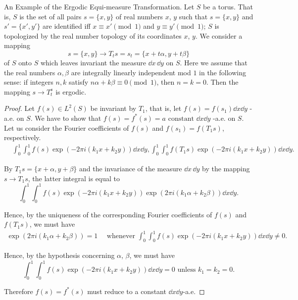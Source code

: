 \begin{enumerate}[1.]
An Example of the Ergodic Equi-measure Transformation. Let $S$ be a torus. That is, $S$ is the set of all pairs $s = \{x, y\}$ of real numbers $x$, $y$ such that $s = \{x, y\}$ and $s' = \{x', y'\}$ are identified iff $x \equiv x' \pmod{1}$ and $y \equiv y' \pmod{1}$; $S$ is topologized by the real number topology of its coordinates $x$, $y$. We consider a mapping 
\[
s = \{x, y \} \rightarrow T _{t} s = s _{t} = \{x + t \alpha , y + t \beta \}
\]
of $S$ onto $S$ which leaves invariant the measure $\dd x \, \dd y$ on $S$. Here we assume that the real numbers $\alpha, \beta$ are integrally linearly independent mod $1$ in the following sense: if integers $n, k$ satisfy $n\alpha + k\beta \equiv 0 \pmod{1}$, then $n = k = 0$. Then the mapping $s \to T_t^s$ is ergodic. 

\begin{proof}
 Let $f(s) \in L^2(S)$ be invariant by $T_1$, that is, let $f(s) = f(s_1) \dd x \dd y$ -a.e. on $S$. We have to show that $f(s) = f^*(s) = a \text{ constant } \dd x \dd y$ -a.e. on $S$. Let us consider the Fourier coefficients of $f(s)$ and $f(s_1) = f(T_1 s)$, respectively. 
\[
\begin{aligned}
&\int_{0} ^{1} \int_{0} ^{1} f (s) \exp (- 2 \pi i (k _{1} x + k _{2} y)) \dd x \dd y, \int_{0} ^{1} \int_{0} ^{1} f (T _{1} s) \exp (- 2 \pi i (k _{1} x + k _{2} y)) \dd x \dd y.
\end{aligned}
\]

By $T_{1}s = \{x + \alpha, y + \beta\}$ and the invariance of the measure $\dd x \, \dd y$ by the mapping $s \to T_{1}s$, the latter integral is equal to 
\[
\int_{0} ^{1} \int_{0} ^{1} f (s) \exp \left(- 2 \pi i (k _{1} x + k _{2} y)\right) \exp \left(2 \pi i (k _{1} \alpha + k _{2} \beta)\right) \dd x \dd y.
\]

Hence, by the uniqueness of the corresponding Fourier coefficients of $f(s)$ and $f(T_{1}s)$, we must have 
\[
\begin{gathered}
\exp (2 \pi i (k _{1} \alpha + k _{2} \beta)) = 1 \quad \text{ whenever } \int_{0} ^{1} \int_{0} ^{1} f (s) \exp (- 2 \pi i (k _{1} x + k _{2} y)) \dd x \dd y \neq 0.
\end{gathered}
\]

Hence, by the hypothesis concerning $\alpha$, $\beta$, we must have 
\[
\int_{0} ^{1} \int_{0} ^{1} f (s) \exp (- 2 \pi i (k _{1} x + k _{2} y)) \dd x \dd y = 0 \text{ unless } k _{1} = k _{2} = 0.
\]

Therefore $f(s) = f^{*}(s)$ must reduce to a constant $\dd x \dd y$-a.e. 
\end{proof}


\end{enumerate}
